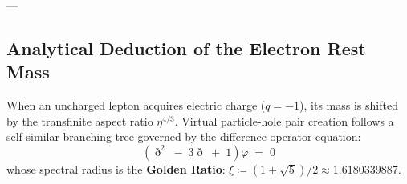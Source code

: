 \documentclass[
    12pt,
    a4paper,
    headings=normal,
    twoside=false,
    open=any,
    parskip=half
]{scrbook}
\newcommand{\ethop}{\eth}
\begin{document}
---

\subsection{Analytical Deduction of the Electron Rest Mass}

When an uncharged lepton acquires electric charge ($q = -1$), its mass is shifted by the transfinite aspect ratio $\eta^{4/3}$. Virtual particle-hole pair creation follows a self-similar branching tree governed by the difference operator equation:
\begin{equation}
\left( \ethop^2 \;-\; 3\ethop \;+\; 1 \right) \varphi \;=\; 0
\label{eq:ch5_fibonacci_tree_ode}
\end{equation}
whose spectral radius is the \textbf{Golden Ratio}: $\xi \coloneqq (1 + \sqrt{5})/2 \approx 1.6180339887$.
\end{document}
